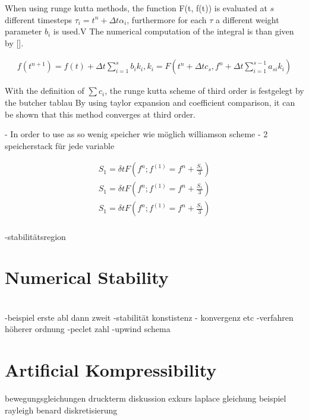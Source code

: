 When using runge kutta methods, the function F(t, f(t)) is evaluated at $s$ different timesteps $\tau_i = t^n + \Delta t \alpha_i$,
furthermore for each $\tau$ a different weight parameter $b_i$ is used.V
The numerical computation of the integral is than given by [].

\begin{align}
    f(t^{n+1}) = f(t) + \Delta t \sum_{i=1}^s b_i k_i, k_i = F(t^n + \Delta t c_s, f^n + \Delta t \sum_{i=1}^{s-1}a_{si}k_i)
\end{align}

With the definition of $\sum c_i$, the runge kutta scheme of third order is festgelegt by the butcher tablau
By using taylor expansion and coefficient comparison, it can be shown that this  method converges at third order.


- In order to use as  so wenig speicher wie möglich williamson scheme
- 2 speicherstack für jede variable

\begin{align}
    S_1 = \delta t F(f^n ; f^(1) = f^n + \frac{S_1}{3}) \\
    S_1 = \delta t F(f^n ; f^(1) = f^n + \frac{S_1}{3}) \\
    S_1 = \delta t F(f^n ; f^(1) = f^n + \frac{S_1}{3}) \\
\end{align}


-stabilitätsregion

\section{Numerical Stability}\mbox{}\\

-beispiel erste abl dann zweit
-stabilität konstistenz - konvergenz etc
-verfahren höherer ordnung
-peclet zahl
-upwind schema



\newpage

\section{Artificial Kompressibility}
bewegungsgleichungen
druckterm diskussion
exkurs laplace gleichung
beispiel rayleigh benard diskretisierung

